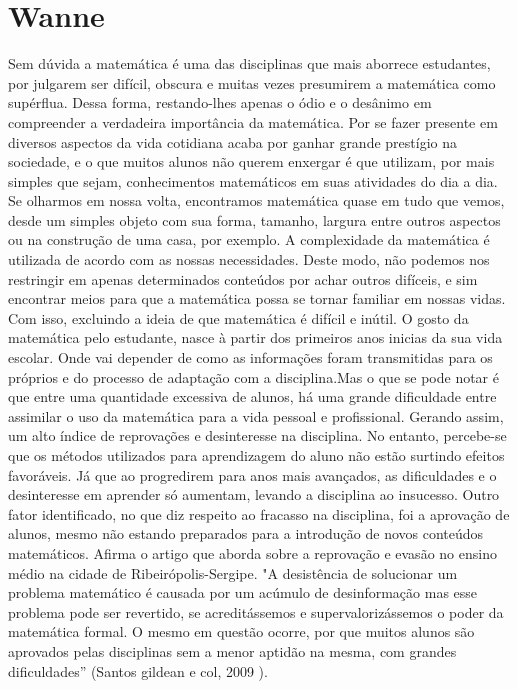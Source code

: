 \documentclass[12pt,a4paper]{article}
\begin{document}
\section{Wanne}
Sem dúvida a matemática é uma das disciplinas que mais aborrece estudantes, por julgarem ser difícil, obscura e muitas vezes presumirem a matemática como supérflua. Dessa forma, restando-lhes apenas o ódio e o desânimo em compreender a verdadeira importância da matemática. 
Por se fazer presente em diversos aspectos da vida cotidiana acaba por ganhar grande prestígio na sociedade, e o que muitos alunos não querem enxergar é que utilizam, por mais simples que sejam, conhecimentos matemáticos em suas atividades do dia a dia. Se olharmos em nossa volta, encontramos matemática quase em tudo que vemos, desde um simples objeto com sua forma, tamanho, largura entre outros aspectos ou na construção de uma casa, por exemplo. 
A complexidade da matemática é utilizada de acordo com as nossas necessidades. Deste modo, não podemos nos restringir em apenas determinados conteúdos por achar outros difíceis, e sim encontrar meios para que a matemática possa se tornar familiar em nossas vidas. Com isso, excluindo a ideia de que matemática é difícil e inútil.
O gosto da matemática pelo estudante, nasce à partir dos primeiros anos inicias da sua vida escolar. Onde vai depender de como as informações foram transmitidas para os próprios e do processo de adaptação com a disciplina.Mas o que se pode notar é que entre uma quantidade excessiva de alunos, há uma grande dificuldade entre assimilar o uso da matemática para a vida pessoal e profissional. Gerando assim, um alto índice de reprovações e desinteresse na disciplina.
No entanto, percebe-se que os métodos utilizados para aprendizagem do aluno não estão surtindo efeitos favoráveis. Já que ao progredirem para anos mais avançados, as dificuldades e o desinteresse em aprender só aumentam, levando a disciplina ao insucesso.
Outro fator identificado, no que diz respeito ao fracasso na disciplina, foi a aprovação de alunos, mesmo não estando preparados para a introdução de novos conteúdos matemáticos. Afirma o artigo que aborda sobre a reprovação e evasão no ensino médio na cidade de Ribeirópolis-Sergipe.
"A desistência de solucionar um problema matemático é causada por um acúmulo de desinformação mas esse problema pode ser revertido, se acreditássemos e supervalorizássemos o poder da matemática formal. O mesmo em questão ocorre, por que muitos alunos são aprovados pelas disciplinas sem a menor aptidão na mesma, com grandes dificuldades” (Santos gildean e col, 2009 ).
\end{document}
